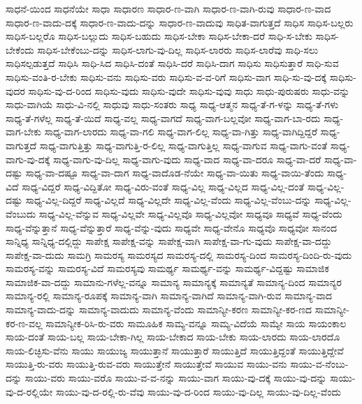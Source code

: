 {ಸಾಧನೆ-ಯಿಂದ
ಸಾಧನೆಯೇ
ಸಾಧಾ
ಸಾಧಾರಣ
ಸಾಧಾರ-ಣ-ವಾಗಿ
ಸಾಧಾರ-ಣ-ವಾಗಿ-ರುವು
ಸಾಧಾರ-ಣ-ವಾದ
ಸಾಧಾರ-ಣ-ವಾದು-ದಕ್ಕೆ
ಸಾಧಾರ-ಣ-ವಾದು-ದನ್ನು
ಸಾಧಾರ-ಣ-ವಾದುವು
ಸಾಧಿತ-ವಾಗುತ್ತದೆ
ಸಾಧಿಸ
ಸಾಧಿಸ-ಬಲ್ಲರು
ಸಾಧಿಸ-ಬಲ್ಲರೊ
ಸಾಧಿಸ-ಬಲ್ಲುದು
ಸಾಧಿಸ-ಬಹುದು
ಸಾಧಿಸ-ಬೇಕಾ
ಸಾಧಿಸ-ಬೇಕಾ-ದರೆ
ಸಾಧಿ-ಸ-ಬೇಕು
ಸಾಧಿಸ-ಬೇಕೆಂದು
ಸಾಧಿಸ-ಬೇಕೆಂಬು-ದನ್ನು
ಸಾಧಿಸ-ಲಾಗು-ವು-ದಿಲ್ಲ
ಸಾಧಿಸ-ಲಾರರು
ಸಾಧಿಸ-ಲಾರೆವು
ಸಾಧಿ-ಸಲು
ಸಾಧಿಸಲ್ಪಡುತ್ತದೆ
ಸಾಧಿಸಿ
ಸಾಧಿ-ಸಿದ
ಸಾಧಿಸಿ-ದಂತೆ
ಸಾಧಿಸಿ-ದರೆ
ಸಾಧಿಸಿ-ದಾಗ
ಸಾಧಿಸು
ಸಾಧಿಸುತ್ತಾರೆ
ಸಾಧಿ-ಸುವ
ಸಾಧಿಸು-ವಂತಿ-ರ-ಬೇಕು
ಸಾಧಿಸು-ವನು
ಸಾಧಿಸು-ವರು
ಸಾಧಿಸು-ವ-ವ-ರಿಗೆ
ಸಾಧಿಸು-ವಾಗ
ಸಾಧಿ-ಸು-ವು-ದಕ್ಕೆ
ಸಾಧಿಸು-ವುದರ
ಸಾಧಿಸು-ವು-ದ-ರಿಂದ
ಸಾಧಿಸು-ವುದು
ಸಾಧಿಸು-ವುದೇ
ಸಾಧಿಸು-ವುವು
ಸಾಧು
ಸಾಧು-ಪುರುಷರು
ಸಾಧು-ವನ್ನು
ಸಾಧು-ವಾಗಿಯೆ
ಸಾಧು-ವಿ-ನಲ್ಲಿ
ಸಾಧುವು
ಸಾಧು-ಸಂತರು
ಸಾಧ್ಯ
ಸಾಧ್ಯ-ಆತ್ಮನ
ಸಾಧ್ಯ-ತೆ-ಗ-ಳನ್ನು
ಸಾಧ್ಯ-ತೆ-ಗಳು
ಸಾಧ್ಯ-ತೆ-ಗಳೆಲ್ಲ
ಸಾಧ್ಯ-ತೆ-ಯಿದೆ
ಸಾಧ್ಯ-ವಲ್ಲ
ಸಾಧ್ಯ-ವಾಗದೆ
ಸಾಧ್ಯ-ವಾಗ-ಬಲ್ಲವೋ
ಸಾಧ್ಯ-ವಾಗ-ಬಾ-ರದು
ಸಾಧ್ಯ-ವಾಗ-ಬೇಕು
ಸಾಧ್ಯ-ವಾಗ-ಲಾರದು
ಸಾಧ್ಯ-ವಾ-ಗಲಿ
ಸಾಧ್ಯ-ವಾಗ-ಲಿಲ್ಲ
ಸಾಧ್ಯ-ವಾ-ಗಿತ್ತು
ಸಾಧ್ಯ-ವಾಗಿದ್ದಿದ್ದರೆ
ಸಾಧ್ಯ-ವಾಗುತ್ತದೆ
ಸಾಧ್ಯ-ವಾಗುತ್ತಿತ್ತು
ಸಾಧ್ಯ-ವಾಗುತ್ತಿ-ರ-ಲಿಲ್ಲ
ಸಾಧ್ಯ-ವಾಗುತ್ತಿಲ್ಲ
ಸಾಧ್ಯ-ವಾಗುವ
ಸಾಧ್ಯ-ವಾಗು-ವಂತೆ
ಸಾಧ್ಯ-ವಾಗು-ವು-ದಕ್ಕೆ
ಸಾಧ್ಯ-ವಾಗು-ವು-ದಿಲ್ಲ
ಸಾಧ್ಯ-ವಾಗು-ವುದು
ಸಾಧ್ಯ-ವಾದ
ಸಾಧ್ಯ-ವಾ-ದರೂ
ಸಾಧ್ಯ-ವಾ-ದರೆ
ಸಾಧ್ಯ-ವಾ-ದಷ್ಟು
ಸಾಧ್ಯ-ವಾ-ದಷ್ಟೂ
ಸಾಧ್ಯ-ವಾ-ದಾಗ
ಸಾಧ್ಯ-ವಾದೊಡ-ನೆಯೇ
ಸಾಧ್ಯ-ವಾ-ಯಿತು
ಸಾಧ್ಯ-ವಾಯಿ-ತೆಂದು
ಸಾಧ್ಯ-ವಿದೆ
ಸಾಧ್ಯ-ವಿದ್ದರೆ
ಸಾಧ್ಯ-ವಿದ್ದಿತೋ
ಸಾಧ್ಯ-ವಿರು-ವಂತೆ
ಸಾಧ್ಯ-ವಿಲ್ಲ
ಸಾಧ್ಯ-ವಿಲ್ಲದ
ಸಾಧ್ಯ-ವಿಲ್ಲ-ದಂತೆ
ಸಾಧ್ಯ-ವಿಲ್ಲ-ದಷ್ಟು
ಸಾಧ್ಯ-ವಿಲ್ಲ-ದಿದ್ದರೆ
ಸಾಧ್ಯ-ವಿಲ್ಲದೆ
ಸಾಧ್ಯ-ವಿಲ್ಲದೇ
ಸಾಧ್ಯ-ವಿಲ್ಲ-ವೆಂದು
ಸಾಧ್ಯ-ವಿಲ್ಲ-ವೆಂಬು-ದನ್ನು
ಸಾಧ್ಯ-ವಿಲ್ಲ-ವೆಂಬುದು
ಸಾಧ್ಯ-ವಿಲ್ಲ-ವೆನ್ನುವ
ಸಾಧ್ಯ-ವಿಲ್ಲವೇ
ಸಾಧ್ಯ-ವಿಲ್ಲವೊ
ಸಾಧ್ಯ-ವಿಲ್ಲವೋ
ಸಾಧ್ಯವೂ
ಸಾಧ್ಯವೆ
ಸಾಧ್ಯ-ವೆಂದು
ಸಾಧ್ಯ-ವೆನ್ನುತ್ತಾನೆ
ಸಾಧ್ಯ-ವೆನ್ನುತ್ತಾರೆ
ಸಾಧ್ಯ-ವೆನ್ನು-ವುದು
ಸಾಧ್ಯವೇ
ಸಾಧ್ಯ-ವೇನೊ
ಸಾಧ್ಯವೊ
ಸಾಧ್ಯವೋ
ಸಾನಂದ
ಸಾನ್ನಿಧ್ಯ
ಸಾನ್ನಿಧ್ಯ-ದಲ್ಲಿದ್ದು
ಸಾಪೇಕ್ಷ
ಸಾಪೇಕ್ಷ-ವನ್ನು
ಸಾಪೇಕ್ಷ-ವಾಗಿ
ಸಾಪೇಕ್ಷ-ವಾ-ಗು-ವುದು
ಸಾಪೇಕ್ಷ-ವಾ-ದದ್ದು
ಸಾಪೇಕ್ಷ-ವಾ-ದುದು
ಸಾಮಗ್ರಿ
ಸಾಮರಸ್ಯ
ಸಾಮರಸ್ಯದ
ಸಾಮರಸ್ಯ-ದಲ್ಲಿ
ಸಾಮರಸ್ಯ-ದಿಂದ
ಸಾಮರಸ್ಯ-ದಿಂದಿ-ರು-ವುದು
ಸಾಮರಸ್ಯ-ವನ್ನು
ಸಾಮರಸ್ಯ-ವಿದೆ
ಸಾಮರಸ್ಯವು
ಸಾಮರ್ಥ್ಯ
ಸಾಮರ್ಥ್ಯ-ವನ್ನು
ಸಾಮರ್ಥ್ಯ-ವಿದ್ದಷ್ಟು
ಸಾಮಾಜಿಕ
ಸಾಮಾಜಿಕ-ವಾ-ದದ್ದು
ಸಾಮಾನು-ಗಳೆಲ್ಲ-ವನ್ನೂ
ಸಾಮಾನ್ಯ
ಸಾಮಾನ್ಯಕ್ಕೆ
ಸಾಮಾನ್ಯತೆ
ಸಾಮಾನ್ಯ-ದಿಂದ
ಸಾಮಾನ್ಯರ
ಸಾಮಾನ್ಯ-ರಲ್ಲಿ
ಸಾಮಾನ್ಯ-ರೂಪಕ್ಕೆ
ಸಾಮಾನ್ಯ-ವಾಗಿ
ಸಾಮಾನ್ಯ-ವಾಗಿದೆ
ಸಾಮಾನ್ಯ-ವಾಗಿ-ರುವ
ಸಾಮಾನ್ಯ-ವಾದ
ಸಾಮಾನ್ಯ-ವಾದು-ದನ್ನು
ಸಾಮಾನ್ಯ-ವಾದುದು
ಸಾಮಾನ್ಯ-ವೆಂದು
ಸಾಮಾನ್ಯೀ-ಕರಣ
ಸಾಮಾನ್ಯೀ-ಕರ-ಣದ
ಸಾಮಾನ್ಯೀ-ಕರ-ಣ-ವಲ್ಲ
ಸಾಮಾನ್ಯೀಕ-ರಿಸಿ-ರು-ವರು
ಸಾಮೂಹಿಕ
ಸಾಮ್ಯ-ವನ್ನೂ
ಸಾಮ್ಯ-ವಿದೆಯೆ
ಸಾಮ್ಯೇ
ಸಾಯ
ಸಾಯಂಕಾಲ
ಸಾಯ-ದಂತೆ
ಸಾಯ-ಬಲ್ಲ
ಸಾಯ-ಬೇಕಾ-ಗಿಲ್ಲ
ಸಾಯ-ಬೇಕಾದ
ಸಾಯ-ಬೇಕು
ಸಾಯ-ಲಾರದು
ಸಾಯ-ಲಾರದೊ
ಸಾಯ-ಲಿಚ್ಛಿಸು-ವೆನು
ಸಾಯು
ಸಾಯುಜ್ಯ
ಸಾಯುತ್ತಾನೆ
ಸಾಯುತ್ತಾರೆ
ಸಾಯುತ್ತಿದೆ
ಸಾಯುತ್ತಿದ್ದಂತೆ
ಸಾಯುತ್ತಿದ್ದೇವೆ
ಸಾಯುತ್ತಿ-ರು-ವರು
ಸಾಯುತ್ತಿ-ರುವ-ವರು
ಸಾಯುತ್ತೇನೆ
ಸಾಯುತ್ತೇವೆ
ಸಾಯುವ
ಸಾಯು-ವನು
ಸಾಯು-ವ-ನೆಂಬು-ದನ್ನು
ಸಾಯು-ವರು
ಸಾಯು-ವರೊ
ಸಾಯು-ವ-ವ-ನನ್ನು
ಸಾಯು-ವಾಗ
ಸಾಯು-ವು-ದಕ್ಕೆ
ಸಾಯು-ವು-ದನ್ನು
ಸಾಯು-ವು-ದ-ರಲ್ಲಿಯೇ
ಸಾಯು-ವು-ದ-ರಲ್ಲಿ-ರು-ವೆವು
ಸಾಯು-ವು-ದ-ರಿಂದ
ಸಾಯು-ವು-ದಿಲ್ಲ
ಸಾಯು-ವು-ದಿಲ್ಲ-ವೆಂದು
}

